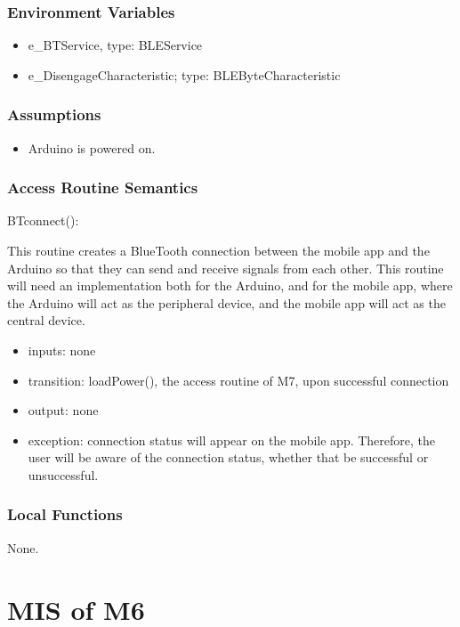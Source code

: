 \documentclass[12pt, titlepage]{article}
\begin{document}
\subsubsection{Environment Variables}

\begin{itemize}
\item e\_BTService, type: BLEService
\item e\_DisengageCharacteristic; type: BLEByteCharacteristic
\end{itemize}


\subsubsection{Assumptions}

\begin{itemize}
\item Arduino is powered on.
\end{itemize}

\subsubsection{Access Routine Semantics}

\noindent BTconnect():

This routine creates a BlueTooth connection between the mobile app and the Arduino so that they can send and receive signals from each other. This routine will need an implementation both for the Arduino, and for the mobile app, where the Arduino will act as the peripheral device, and the mobile app will act as the central device. 

\begin{itemize} 
\item inputs: none
\item transition: loadPower(), the access routine of M7, upon successful connection
\item output: none
\item exception: connection status will appear on the mobile app. Therefore, the user will be aware of the connection status, whether that be successful or unsuccessful. 
\end{itemize}

\subsubsection{Local Functions}

None.


\section{MIS of M6} \label{BatteryStatus} 
\end{document}
